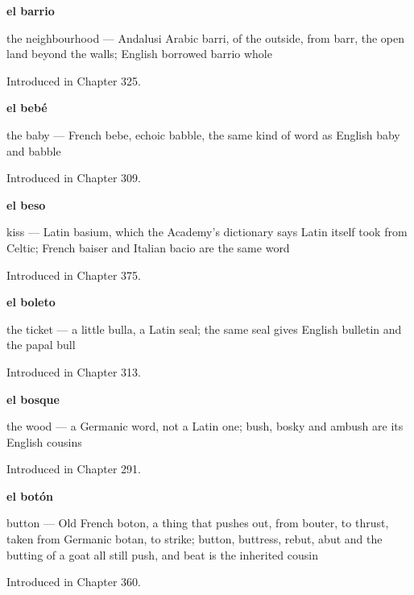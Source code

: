 \noindent\begin{minipage}[t]{\linewidth}
\raggedright
\textbf{el barrio}\par
\small the neighbourhood — Andalusi Arabic barri, of the outside, from barr, the open land beyond the walls; English borrowed barrio whole\par
\footnotesize Introduced in Chapter 325.
\end{minipage}\par\medskip

\noindent\begin{minipage}[t]{\linewidth}
\raggedright
\textbf{el bebé}\par
\small the baby --- French bebe, echoic babble, the same kind of word as English baby and babble\par
\footnotesize Introduced in Chapter 309.
\end{minipage}\par\medskip

\noindent\begin{minipage}[t]{\linewidth}
\raggedright
\textbf{el beso}\par
\small kiss — Latin basium, which the Academy's dictionary says Latin itself took from Celtic; French baiser and Italian bacio are the same word\par
\footnotesize Introduced in Chapter 375.
\end{minipage}\par\medskip

\noindent\begin{minipage}[t]{\linewidth}
\raggedright
\textbf{el boleto}\par
\small the ticket — a little bulla, a Latin seal; the same seal gives English bulletin and the papal bull\par
\footnotesize Introduced in Chapter 313.
\end{minipage}\par\medskip

\noindent\begin{minipage}[t]{\linewidth}
\raggedright
\textbf{el bosque}\par
\small the wood — a Germanic word, not a Latin one; bush, bosky and ambush are its English cousins\par
\footnotesize Introduced in Chapter 291.
\end{minipage}\par\medskip

\noindent\begin{minipage}[t]{\linewidth}
\raggedright
\textbf{el botón}\par
\small button — Old French boton, a thing that pushes out, from bouter, to thrust, taken from Germanic botan, to strike; button, buttress, rebut, abut and the butting of a goat all still push, and beat is the inherited cousin\par
\footnotesize Introduced in Chapter 360.
\end{minipage}\par\medskip

